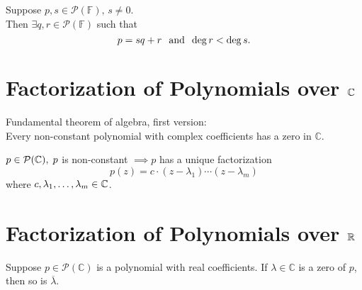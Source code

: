 \setcounter{thm}{8}
\begin{thm}
  \label{division-algorithm-for-polynomials}
  Suppose $p,s \in \mathcal{P} (\mathbb{F}), \, s\neq 0$. \\
  Then $\exists q,r \in \mathcal{P} (\mathbb{F})$ such that
  \begin{equation}
  	p=sq+r \;\;\, \text{and}\;\; \deg r < \deg s.
  \end{equation}
\end{thm}

\section{Factorization of Polynomials over $\mathbb{C}$}
\setcounter{thm}{11}
\begin{thm}
  \label{fundamental-theorem-of-algebra-first-version}
  Fundamental theorem of algebra, first version: \\
  Every non-constant polynomial with complex coefficients has a zero in $\mathbb{C}$.
\end{thm}

\begin{thm} 
  \label{fundamental-theorem-of-algebra-second-version}
  $p \in \mathcal{P}(\mathbb{C}), \; p$ is non-constant $\implies p$ has a unique factorization
  \begin{equation}
  	p(z)=c \cdot (z-\lambda_1) \cdots (z-\lambda_m) 
  \end{equation}
  where $c, \lambda_1, \dots, \lambda_m \in \mathbb{C}$.
\end{thm}

\section{Factorization of Polynomials over $\mathbb{R}$}
\begin{thm}
  Suppose $p\in \mathcal{P} (\mathbb{C})$ is a polynomial with real coefficients. If $\lambda \in \mathbb{C}$ is a zero of $p$, then so is $\overline{\lambda}$.
\end{thm}

